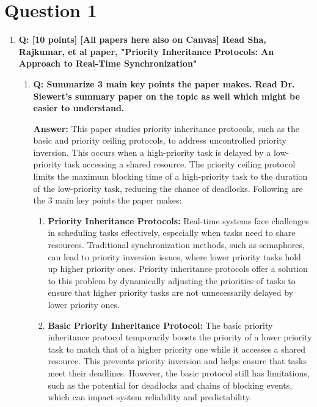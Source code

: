 \documentclass[a4paper,11pt]{article}%
\newenvironment{qanda}{\setlength{\parindent}{0pt}}{\bigskip}
\newcommand{\Q}{\bigskip\bfseries Q: }
\newcommand{\A}{\par\textbf{Answer: } \normalfont}
\begin{document}
\pagebreak
\begin{qanda}
	\section{Question 1}
	\begin{enumerate}
		\item[] \Q [10 points] [All papers here also on Canvas] Read Sha, Rajkumar, et al paper, "Priority Inheritance Protocols: An Approach to Real-Time Synchronization"
			\begin{enumerate}
				\item \Q Summarize 3 main key points the paper makes. Read Dr. Siewert’s summary paper on the topic as well which might be easier to understand.

				      \A
				      This paper studies priority inheritance protocols, such as the basic and priority ceiling protocols, to address uncontrolled priority inversion. This occurs when a high-priority task is delayed by a low-priority task accessing a shared resource. The priority ceiling protocol limits the maximum blocking time of a high-priority task to the duration of the low-priority task, reducing the chance of deadlocks. Following are the 3 main key points the paper makes:\\
				      \begin{enumerate}
					      \item[] \textbf{Priority Inheritance Protocols:} Real-time systems face challenges in scheduling tasks effectively, especially when tasks need to share resources. Traditional synchronization methods, such as semaphores, can lead to priority inversion issues, where lower priority tasks hold up higher priority ones. Priority inheritance protocols offer a solution to this problem by dynamically adjusting the priorities of tasks to ensure that higher priority tasks are not unnecessarily delayed by lower priority ones.
					      \item[] \textbf{Basic Priority Inheritance Protocol:} The basic priority inheritance protocol temporarily boosts the priority of a lower priority task to match that of a higher priority one while it accesses a shared resource. This prevents priority inversion and helps ensure that tasks meet their deadlines. However, the basic protocol still has limitations, such as the potential for deadlocks and chains of blocking events, which can impact system reliability and predictability.

\end{enumerate}
\end{enumerate}
\end{enumerate}
\end{qanda}
\end{document}
